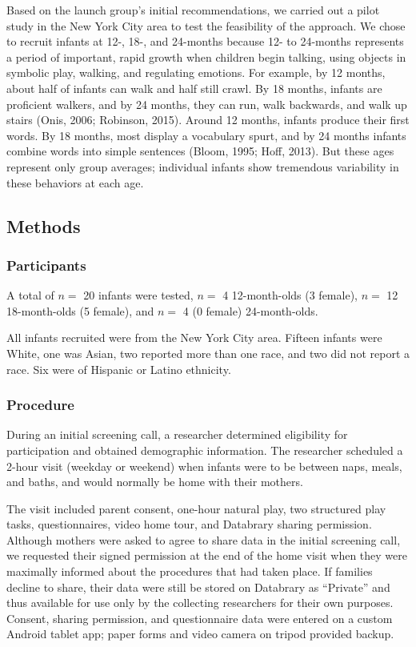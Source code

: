 \documentclass[english,man]{apa6}
\theoremstyle{definition}
\theoremstyle{definition}
\theoremstyle{definition}
\theoremstyle{remark}
\begin{document}
Based on the launch group's initial recommendations, we carried out a
pilot study in the New York City area to test the feasibility of the
approach. We chose to recruit infants at 12-, 18-, and 24-months because
12- to 24-months represents a period of important, rapid growth when
children begin talking, using objects in symbolic play, walking, and
regulating emotions. For example, by 12 months, about half of infants
can walk and half still crawl. By 18 months, infants are proficient
walkers, and by 24 months, they can run, walk backwards, and walk up
stairs (Onis, 2006; Robinson, 2015). Around 12 months, infants produce
their first words. By 18 months, most display a vocabulary spurt, and by
24 months infants combine words into simple sentences (Bloom, 1995;
Hoff, 2013). But these ages represent only group averages; individual
infants show tremendous variability in these behaviors at each age.

\subsection{Methods}\label{methods}

\subsubsection{Participants}\label{participants}

A total of \(n=\) 20 infants were tested, \(n=\) 4 12-month-olds (3
female), \(n=\) 12 18-month-olds (5 female), and \(n=\) 4 (0 female)
24-month-olds.

All infants recruited were from the New York City area. Fifteen infants
were White, one was Asian, two reported more than one race, and two did
not report a race. Six were of Hispanic or Latino ethnicity.

\subsubsection{Procedure}\label{procedure}

During an initial screening call, a researcher determined eligibility
for participation and obtained demographic information. The researcher
scheduled a 2-hour visit (weekday or weekend) when infants were to be
between naps, meals, and baths, and would normally be home with their
mothers.

The visit included parent consent, one-hour natural play, two structured
play tasks, questionnaires, video home tour, and Databrary sharing
permission. Although mothers were asked to agree to share data in the
initial screening call, we requested their signed permission at the end
of the home visit when they were maximally informed about the procedures
that had taken place. If families decline to share, their data were
still be stored on Databrary as \enquote{Private} and thus available for
use only by the collecting researchers for their own purposes. Consent,
sharing permission, and questionnaire data were entered on a custom
Android tablet app; paper forms and video camera on tripod provided
backup.
\end{document}
